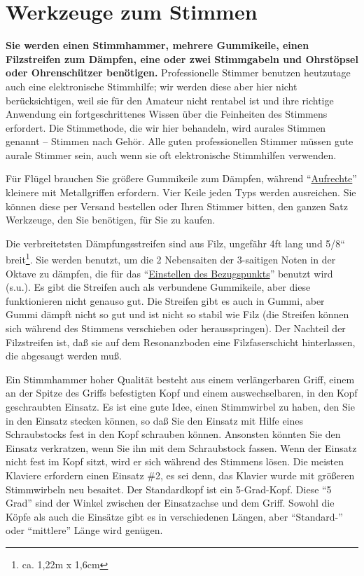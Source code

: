 
\section{Werkzeuge zum Stimmen}
\label{c2_3}

\textbf{Sie werden einen Stimmhammer, mehrere Gummikeile, einen Filzstreifen zum Dämpfen, eine oder zwei Stimmgabeln und Ohrstöpsel oder Ohrenschützer benötigen.}
Professionelle Stimmer benutzen heutzutage auch eine elektronische Stimmhilfe; wir werden diese aber hier nicht berücksichtigen, weil sie für den Amateur nicht rentabel ist und ihre richtige Anwendung ein fortgeschrittenes Wissen über die Feinheiten des Stimmens erfordert.
Die Stimmethode, die wir hier behandeln, wird aurales Stimmen genannt -- Stimmen nach Gehör.
Alle guten professionellen Stimmer müssen gute aurale Stimmer sein, auch wenn sie oft elektronische Stimmhilfen verwenden.

Für Flügel brauchen Sie größere Gummikeile zum Dämpfen, während \enquote{\hyperref[upright]{Aufrechte}} kleinere mit Metallgriffen erfordern.
Vier Keile jeden Typs werden ausreichen.
Sie können diese per Versand bestellen oder Ihren Stimmer bitten, den ganzen Satz Werkzeuge, den Sie benötigen, für Sie zu kaufen.

Die verbreitetsten Dämpfungsstreifen sind aus Filz, ungefähr 4ft lang und 5/8`` breit\footnote{ca. 1,22m x 1,6cm}.
Sie werden benutzt, um die 2 Nebensaiten der 3-saitigen Noten in der Oktave zu dämpfen, die für das \enquote{\hyperref[c2_4]{Einstellen des Bezugspunkts}} benutzt wird (s.u.).
Es gibt die Streifen auch als verbundene Gummikeile, aber diese funktionieren nicht genauso gut.
Die Streifen gibt es auch in Gummi, aber Gummi dämpft nicht so gut und ist nicht so stabil wie Filz (die Streifen können sich während des Stimmens verschieben oder herausspringen).
Der Nachteil der Filzstreifen ist, daß sie auf dem Resonanzboden eine Filzfaserschicht hinterlassen, die abgesaugt werden muß.

Ein Stimmhammer hoher Qualität besteht aus einem verlängerbaren Griff, einem an der Spitze des Griffs befestigten Kopf und einem auswechselbaren, in den Kopf geschraubten Einsatz.
Es ist eine gute Idee, einen Stimmwirbel zu haben, den Sie in den Einsatz stecken können, so daß Sie den Einsatz mit Hilfe eines Schraubstocks fest in den Kopf schrauben können.
Ansonsten könnten Sie den Einsatz verkratzen, wenn Sie ihn mit dem Schraubstock fassen.
Wenn der Einsatz nicht fest im Kopf sitzt, wird er sich während des Stimmens lösen.
Die meisten Klaviere erfordern einen Einsatz \#2, es sei denn, das Klavier wurde mit größeren Stimmwirbeln neu besaitet.
Der Standardkopf ist ein 5-Grad-Kopf.
Diese \enquote{5 Grad} sind der Winkel zwischen der Einsatzachse und dem Griff.
Sowohl die Köpfe als auch die Einsätze gibt es in verschiedenen Längen, aber \enquote{Standard-} oder \enquote{mittlere} Länge wird genügen.
 

